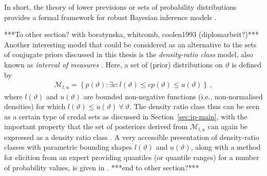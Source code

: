 In short, the theory of lower previsions or sets of probability distributions
provides a formal framework for robust Bayesian inference models
\parencite{1994:berger}.

***To other section? with boratynska, whitcomb, coolen1993 (diplomarbeit?)***\\
Another interesting model that could be considered
as an alternative to the sets of conjugate priors discussed in this thesis
is the \emph{density-ratio class} model,
also known as \emph{interval of measures}
\parencites{1981:derobertis}{1990:berger}.
Here, a set of (prior) distributions on $\vartheta$ is defined by %
\begin{align*}
\mathcal{M}_{l,u} = \left\{ p(\vartheta) :
\exists c: l(\vartheta) \le c p(\vartheta) \le u(\vartheta)\right\}\,,
\end{align*}
where $l(\vartheta)$ and $u(\vartheta)$ are bounded non-negative functions (i.e., non-normalised densities)	
for which $l(\vartheta) \le u(\vartheta)\ \forall\ \vartheta$.
The density ratio class thus can be seen as a certain type of credal sets as discussed in Section~\ref{sec:ip-main},
with the important property that the set of posteriors derived from $\mathcal{M}_{l,u}$
can again be expressed as a density ratio class \parencite{1981:derobertis}.
A very accessible presentation of density-ratio classes with
parametric bounding shapes $l(\vartheta)$ and $u(\vartheta)$,
along with a method for elicition from an expert
providing quantiles (or quantile ranges) for a number of probability values,
is given in \cite{2011:rinderknecht}.
***end to other section?***





